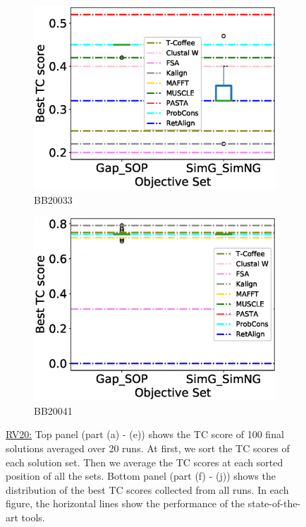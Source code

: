 \begin{figure}[!htbp]
\begin{adjustwidth}{-1.5cm}{-1cm}
\begin{subfigure}{0.22\textwidth}
			\includegraphics[width=\columnwidth]{Figure/summary/precomputedInit/Balibase/BB20033_objset_tc_rank_2}
			\caption{BB20033}
		\end{subfigure}
		\begin{subfigure}{0.22\textwidth}
			\includegraphics[width=\columnwidth]{Figure/summary/precomputedInit/Balibase/BB20041_objset_tc_rank_2}
			\caption{BB20041}
		\end{subfigure}
		\end{adjustwidth}
		\caption[TC score results on RV20]{\underline{RV20:} Top panel (part (a) - (e)) shows the TC score of 100 final solutions averaged over 20 runs. At first, we sort the TC scores of each solution set. Then we average the TC scores at each sorted position of all the sets. Bottom panel (part (f) - (j)) shows the distribution of the best TC scores collected from all runs. In each figure, the horizontal lines show the performance of the state-of-the-art tools.}
		\label{fig:rv20_tc}

\end{figure}

